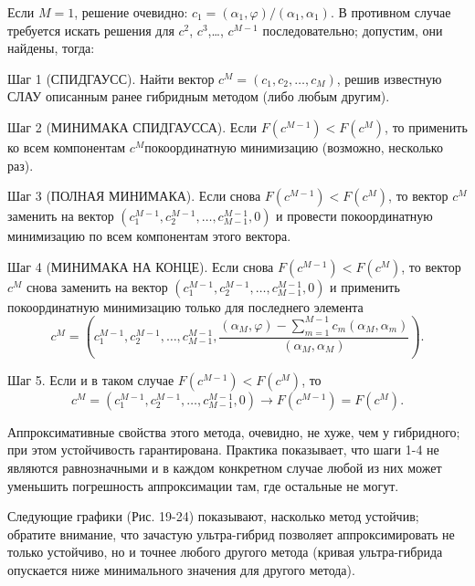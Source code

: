 ﻿\documentclass[a4paper, 12pt]{article}
\begin{document}
Если $M=1$, решение очевидно: $c_1=\left({\alpha }_1,\varphi \right)/\left({\alpha }_1,{\alpha }_1\right)$. В противном случае требуется искать решения для $c^2$, $c^3$,{\dots}, $c^{M-1}$ последовательно; допустим, они найдены, тогда:

Шаг 1 (СПИДГАУСС). Найти вектор $c^M=\left(c_1,c_2,\dots ,c_M\right)$, решив известную СЛАУ описанным ранее гибридным методом (либо любым другим).

Шаг 2 (МИНИМАКА СПИДГАУССА). Если $F\left(c^{M-1}\right)<F\left(c^M\right)$, то применить ко всем компонентам $c^M$покоординатную минимизацию (возможно, несколько раз).

Шаг 3 (ПОЛНАЯ МИНИМАКА). Если снова $F\left(c^{M-1}\right)<F\left(c^M\right)$, то вектор $c^M$ заменить на вектор $\left(c^{M-1}_1,c^{M-1}_2,\dots ,c^{M-1}_{M-1},0\right)$ и провести покоординатную минимизацию по всем компонентам этого вектора.

Шаг 4 (МИНИМАКА НА КОНЦЕ). Если снова $F\left(c^{M-1}\right)<F\left(c^M\right)$, то вектор $c^M$ снова заменить на вектор $\left(c^{M-1}_1,c^{M-1}_2,\dots ,c^{M-1}_{M-1},0\right)$ и применить покоординатную минимизацию только для последнего элемента
\begin{equation}c^M=\left(c^{M-1}_1,c^{M-1}_2,\dots ,c^{M-1}_{M-1},\frac{\left({\alpha }_M,\varphi \right)-\sum^{M-1}_{m=1}{c_m}\left({\alpha }_M,{\alpha }_m\right)}{\left({\alpha }_M,{\alpha }_M\right)}\right).\end{equation} 

Шаг 5. Если и в таком случае $F\left(c^{M-1}\right)<F\left(c^M\right)$, то 
\begin{equation}c^M=\left(c^{M-1}_1,c^{M-1}_2,\dots ,c^{M-1}_{M-1},0\right)\to F\left(c^{M-1}\right)=F\left(c^M\right).\end{equation} 

Аппроксимативные свойства этого метода, очевидно, не хуже, чем у гибридного; при этом устойчивость гарантирована. Практика показывает, что шаги 1-4 не являются равнозначными и в каждом конкретном случае любой из них может уменьшить погрешность аппроксимации там, где остальные не могут.

Следующие графики (Рис. 19-24) показывают, насколько метод устойчив; обратите внимание, что зачастую ультра-гибрид позволяет аппроксимировать не только устойчиво, но и точнее любого другого метода (кривая ультра-гибрида опускается ниже минимального значения для другого метода).
\end{document}
